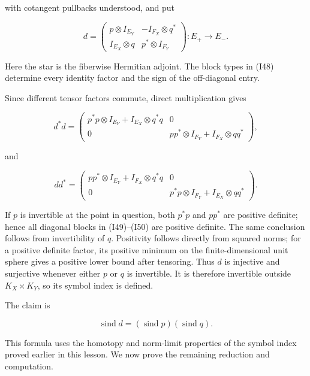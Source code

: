 \documentclass[
  11pt,
]{article}
\makeatletter
\let\ReaderOriginalAnchorStart\hyper@anchorstart
\let\ReaderOriginalAnchorEnd\hyper@anchorend
\let\ReaderPendingAliases\@empty
\def\ReaderArmAliases#1{\gdef\ReaderPendingAliases{#1}}
\def\hyper@anchorstart#1{\ReaderIfNativeAnchorTF{#1}{\ReaderPendingAliases\global\let\ReaderPendingAliases\@empty}{}\ReaderOriginalAnchorStart{#1}}
\makeatother
\begin{document}
with cotangent pullbacks understood, and put

\[
 d=\begin{pmatrix}
 p\otimes I_{E_Y}&-I_{F_X}\otimes q^*\\
 I_{E_X}\otimes q&p^*\otimes I_{F_Y}
 \end{pmatrix}:E_+\longrightarrow E_-.
 \tag{I48}
\]

Here the star is the fiberwise Hermitian adjoint. The block types in
(I48) determine every identity factor and the sign of the off-diagonal
entry.

Since different tensor factors commute, direct multiplication gives

\[
 d^*d=\begin{pmatrix}
 p^*p\otimes I_{E_Y}+I_{E_X}\otimes q^*q&0\\
 0&pp^*\otimes I_{F_Y}+I_{F_X}\otimes qq^*
 \end{pmatrix},
 \tag{I49}
\]

and

\[
 dd^*=\begin{pmatrix}
 pp^*\otimes I_{E_Y}+I_{F_X}\otimes q^*q&0\\
 0&p^*p\otimes I_{F_Y}+I_{E_X}\otimes qq^*
 \end{pmatrix}.
 \tag{I50}
\]

If \(p\) is invertible at the point in question, both \(p^*p\) and
\(pp^*\) are positive definite; hence all diagonal blocks in
(I49)--(I50) are positive definite. The same conclusion follows from
invertibility of \(q\). Positivity follows directly from squared norms;
for a positive definite factor, its positive minimum on the
finite-dimensional unit sphere gives a positive lower bound after
tensoring. Thus \(d\) is injective and surjective whenever either \(p\)
or \(q\) is invertible. It is therefore invertible outside
\(K_X\times K_Y\), so its symbol index is defined.

The claim is

\[
 \operatorname{sind}d
     =(\operatorname{sind}p)(\operatorname{sind}q).
 \tag{I51}
\]

This formula uses the homotopy and norm-limit properties of the symbol
index proved earlier in this lesson. We now prove the remaining
reduction and computation.

\ReaderArmAliases{\ReaderOriginalAnchorStart{pp-d-continuous-symbols-can-be-reduced-to-degree-one}\ReaderOriginalAnchorEnd\begingroup\expandafter\def\csname @currentHref\endcsname{pp-d-continuous-symbols-can-be-reduced-to-degree-one}\label{pp-d-continuous-symbols-can-be-reduced-to-degree-one}\endgroup\ReaderOriginalAnchorStart{11-2-reduction-of-continuous-symbols-to-degree-one}\ReaderOriginalAnchorEnd\begingroup\expandafter\def\csname @currentHref\endcsname{11-2-reduction-of-continuous-symbols-to-degree-one}\label{11-2-reduction-of-continuous-symbols-to-degree-one}\endgroup}
\end{document}
